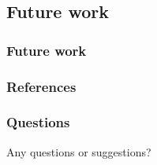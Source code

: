 \documentclass{beamer}
\begin{document}
\begin{frame}
\section{Future work}
\frametitle{Future work}
\end{frame}

\begin{frame}
\frametitle{References}
\end{frame}

\begin{frame}
\frametitle{Questions}
\begin{center}
\begin{Huge}
Any questions or suggestions?
\end{Huge}
\end{center}
\end{frame}
\end{document}
